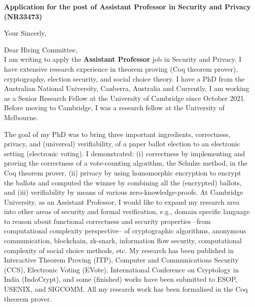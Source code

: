 \documentclass[11pt,a4paper,roman]{moderncv}
\begin{document}
\date{}
\opening{\textbf{Application for the post of Assistant Professor in Security and Privacy (NR33473)}}
\closing{Your Sincerly, \vspace{-1em}}



\makelettertitle



Dear Hiring Committee, 
\\
\vspace{1em}
I am writing to apply
the \textbf{Assistant Professor} job in Security and Privacy. 
I have extensive research experience in
theorem proving (Coq theorem prover), cryptography, election security, and social choice theory. 
I have a PhD from the Australian National University, Canberra, Australia
and Currently, I am working as a Senior Research Fellow at the University of 
Cambridge since October 2021. Before moving to Cambridge, I was a 
research fellow at the University of Melbourne. 


The goal of my PhD was to 
bring  three important ingredients, correctness, privacy, and (universal) verifiability, of a 
paper ballot election to an electronic setting (electronic voting). I 
demonstrated: (i) correctness by implementing and proving the correctness of 
a vote-counting algorithm, the Schulze method, in the Coq theorem prover, 
(ii) privacy by using homomorphic encryption to encrypt the ballots and computed
the winner by combining all the (encrypted) ballots, and 
(iii) verifiability by means of various zero-knowledge-proofs.
At Cambridge University, as an Assistant Professor, 
I would like to expand my research area into other areas of 
security and formal verification, e.g., domain specific language to reason about 
functional correctness and security properties --from computational complexity perspective-- of 
cryptographic algorithms, anonymous communication, blockchain, zk-snark,  
information flow security, computational complexity of social choice methods, 
etc. My research has been published in Interactive Theorem Proving (ITP), 
Computer and Communications Security (CCS), Electronic Voting (EVote), 
International Conference on Cryptology in India (IndoCrypt),
and some (finished) works have been submitted to ESOP, USENIX, and SIGCOMM. 
All my research work has been formalised in the Coq theorem prover. 
\end{document}
